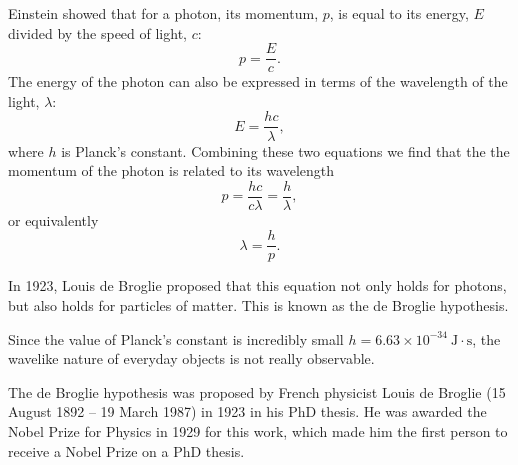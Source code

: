 Einstein showed that for a photon, its momentum, $p$, is equal to its energy, $E$ divided by the speed of light, $c$:
$$p=\frac{E}{c}.$$
The energy of the photon can also be expressed in terms of the wavelength of the light, $\lambda$:
$$E=\frac{hc}{\lambda},$$
where $h$ is Planck's constant. Combining these two equations we find that the the momentum of the photon is related to its wavelength
$$p=\frac{hc}{c\lambda}=\frac{h}{\lambda},$$
or equivalently
$$\lambda=\frac{h}{p}.$$

In 1923, Louis de Broglie proposed that this equation not only holds for photons, but also holds for  particles of matter. This is known as the de Broglie hypothesis.
 

Since the value of Planck's constant is incredibly small $h = 6.63\times10^{-34}~\mathrm{J\cdot s}$, the wavelike nature of everyday objects is not really observable. 

\begin{IFact}
{The de Broglie hypothesis was proposed by French physicist Louis de Broglie (15 August 1892 -- 19 March 1987) in 1923 in his PhD thesis. He was awarded the Nobel Prize for Physics in 1929 for this work, which made him the first person to receive a Nobel Prize on a PhD thesis.}
\end{IFact}

